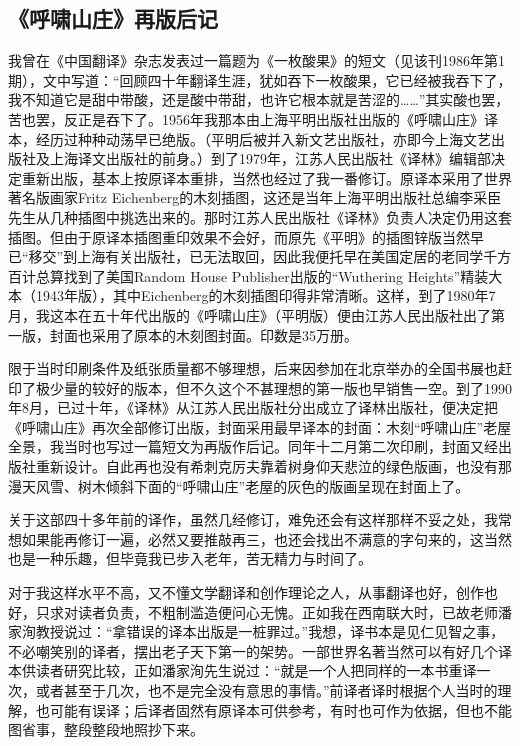 \subsection{《呼啸山庄》再版后记}

\par 我曾在《中国翻译》杂志发表过一篇题为《一枚酸果》的短文（见该刊1986年第1期），文中写道：“回顾四十年翻译生涯，犹如吞下一枚酸果，它已经被我吞下了，我不知道它是甜中带酸，还是酸中带甜，也许它根本就是苦涩的……”其实酸也罢，苦也罢，反正是吞下了。1956年我那本由上海平明出版社出版的《呼啸山庄》译本，经历过种种动荡早已绝版。（平明后被并入新文艺出版社，亦即今上海文艺出版社及上海译文出版社的前身。）到了1979年，江苏人民出版社《译林》编辑部决定重新出版，基本上按原译本重排，当然也经过了我一番修订。原译本采用了世界著名版画家Fritz Eichenberg的木刻插图，这还是当年上海平明出版社总编李采臣先生从几种插图中挑选出来的。那时江苏人民出版社《译林》负责人决定仍用这套插图。但由于原译本插图重印效果不会好，而原先《平明》的插图锌版当然早已“移交”到上海有关出版社，已无法取回，因此我便托早在美国定居的老同学千方百计总算找到了美国Random House Publisher出版的“Wuthering Heights”精装大本（1943年版），其中Eichenberg的木刻插图印得非常清晰。这样，到了1980年7月，我这本在五十年代出版的《呼啸山庄》（平明版）便由江苏人民出版社出了第一版，封面也采用了原本的木刻图封面。印数是35万册。
\par 限于当时印刷条件及纸张质量都不够理想，后来因参加在北京举办的全国书展也赶印了极少量的较好的版本，但不久这个不甚理想的第一版也早销售一空。到了1990年8月，已过十年，《译林》从江苏人民出版社分出成立了译林出版社，便决定把《呼啸山庄》再次全部修订出版，封面采用最早译本的封面：木刻“呼啸山庄”老屋全景，我当时也写过一篇短文为再版作后记。同年十二月第二次印刷，封面又经出版社重新设计。自此再也没有希刺克厉夫靠着树身仰天悲泣的绿色版画，也没有那漫天风雪、树木倾斜下面的“呼啸山庄”老屋的灰色的版画呈现在封面上了。
\par 关于这部四十多年前的译作，虽然几经修订，难免还会有这样那样不妥之处，我常想如果能再修订一遍，必然又要推敲再三，也还会找出不满意的字句来的，这当然也是一种乐趣，但毕竟我已步入老年，苦无精力与时间了。
\par 对于我这样水平不高，又不懂文学翻译和创作理论之人，从事翻译也好，创作也好，只求对读者负责，不粗制滥造便问心无愧。正如我在西南联大时，已故老师潘家洵教授说过：“拿错误的译本出版是一桩罪过。”我想，译书本是见仁见智之事，不必嘲笑别的译者，摆出老子天下第一的架势。一部世界名著当然可以有好几个译本供读者研究比较，正如潘家洵先生说过：“就是一个人把同样的一本书重译一次，或者甚至于几次，也不是完全没有意思的事情。”前译者译时根据个人当时的理解，也可能有误译；后译者固然有原译本可供参考，有时也可作为依据，但也不能图省事，整段整段地照抄下来。
